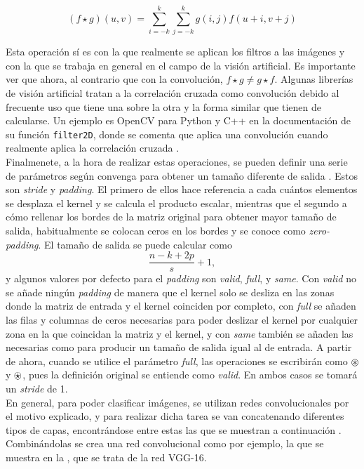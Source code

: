 			$$
			(f \star g)(u, v) = \sum_{i=-k}^{k}\sum_{j=-k}^{k} g(i, j)f(u + i, v + j)
			$$
			
			Esta operación sí es con la que realmente se aplican los filtros a las imágenes y con la que se trabaja en general en el campo de la visión artificial. Es importante ver que ahora, al contrario que con la convolución, $f \star g \neq g \star f$. Algunas librerías de visión artificial tratan a la correlación cruzada como convolución debido al frecuente uso que tiene una sobre la otra y la forma similar que tienen de calcularse. Un ejemplo es OpenCV para Python y C++ en la documentación de su función \texttt{filter2D}, donde se comenta que aplica una convolución cuando realmente aplica la correlación cruzada \cite{OpenCVFiltering}. \\
			
			Finalmenete, a la hora de realizar estas operaciones, se pueden definir una serie de parámetros según convenga para obtener un tamaño diferente de salida \cite{introCNNformula}. Estos son \textit{stride} y \textit{padding}. El primero de ellos hace referencia a cada cuántos elementos se desplaza el kernel y se calcula el producto escalar, mientras que el segundo a cómo rellenar los bordes de la matriz original para obtener mayor tamaño de salida, habitualmente se colocan ceros en los bordes y se conoce como \textit{zero-padding}. El tamaño de salida se puede calcular como 
			$$
			\frac{n-k+2p}{s}+1, 
			$$
			y algunos valores por defecto para el \textit{padding} son \textit{valid},  \textit{full}, y \textit{same}. Con \textit{valid} no se añade ningún \textit{padding} de manera que el kernel solo se desliza en las zonas donde la matriz de entrada y el kernel coinciden por completo, con \textit{full} se añaden las filas y columnas de ceros necesarias para poder deslizar el kernel por cualquier zona en la que coincidan la matriz y el kernel, y con \textit{same} también se añaden las necesarias como para producir un tamaño de salida igual al de entrada. A partir de ahora, cuando se utilice el parámetro \textit{full}, las operaciones se escribirán como $\circledast$ y $\ostar$, pues la definición original se entiende como \textit{valid}. En ambos casos se tomará un \textit{stride} de 1. \\
			
			En general, para poder clasificar imágenes, se utilizan redes convolucionales por el motivo explicado, y para realizar dicha tarea se van concatenando diferentes tipos de capas, encontrándose entre estas las que se muestran a continuación \cite{introCNN}. Combinándolas se crea una red convolucional como por ejemplo, la que se muestra en la , que se trata de la red VGG-16. \\
			
